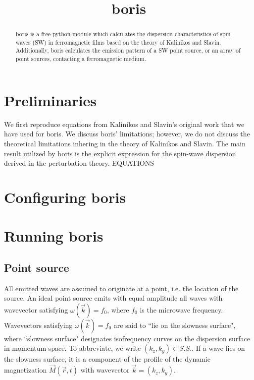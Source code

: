 \documentclass{article}
\title{boris}
\begin{document}
\maketitle
\begin{abstract}
boris is a free python module which calculates the dispersion characteristics of spin waves (SW) in ferromagnetic films based on the theory of Kalinikos and Slavin. Additionally, boris calculates the emission pattern of a SW point source, or an array of point sources, contacting a ferromagnetic medium. 
\end{abstract}
\section{Preliminaries}
We first reproduce equations from Kalinikos and Slavin's original work that we have used for boris. We discuss boris' limitations; however, we do not discuss the theoretical limitations inhering in the theory of Kalinikos and Slavin. The main result utilized by boris is the explicit expression for the spin-wave dispersion derived in the perturbation theory. EQUATIONS

\section{Configuring boris}
\section{Running boris}
\subsection{Point source}
All emitted waves are assumed to originate at a point, i.e. the location of the source. 
An ideal point source emits with equal amplitude all waves with wavevector satisfying $\omega ( \vec{k} ) = f_{0}$, where $f_{0}$ is the microwave frequency. 
Wavevectors satisfying $\omega ( \vec{k} ) = f_{0}$ are said to ``lie on the slowness surface", where ``slowness surface" designates isofrequency curves on the dispersion surface in momentum space. 
To abbreviate, we write $(k_{z},k_{y}) \in S.S.$.
If a wave lies on the slowness surface, it is a component of the profile of the dynamic magnetization $\vec{M}(\vec{r} , t)$ with wavevector $\vec{k} = (k_{z} , k_{y})$. 
\end{document}
